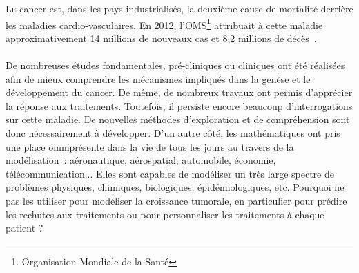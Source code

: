 \documentclass[main.tex]{subfiles}
\begin{document}

\lettrine{L}{e} cancer est, dans les pays industrialisés, la deuxième cause de mortalité derrière les maladies cardio-vasculaires. 
En 2012, l'OMS\footnote{Organisation Mondiale de la Santé} attribuait à cette maladie approximativement 14 millions de nouveaux cas et 8,2 millions de décès~\cite{bernard2014world}. 


\paragraph{}
De nombreuses études fondamentales, pré-cliniques ou cliniques ont été réalisées afin de mieux comprendre les mécanismes impliqués dans la genèse et le développement du cancer. De même, de nombreux travaux ont permis d'apprécier la réponse aux traitements. Toutefois, il persiste encore beaucoup d'interrogations sur cette maladie. De nouvelles méthodes d'exploration et de compréhension sont donc nécessairement à développer.
 D'un autre côté, les mathématiques ont pris une place omniprésente dans la vie de tous les jours au travers de la modélisation~: aéronautique, aérospatial, automobile, économie, télécommunication... Elles sont capables de modéliser un très large spectre de problèmes physiques, chimiques, biologiques, épidémiologiques, etc. Pourquoi ne pas les utiliser pour modéliser la croissance tumorale, en particulier pour prédire les rechutes aux traitements ou pour personnaliser les traitements à chaque patient ? 
 
\end{document}
